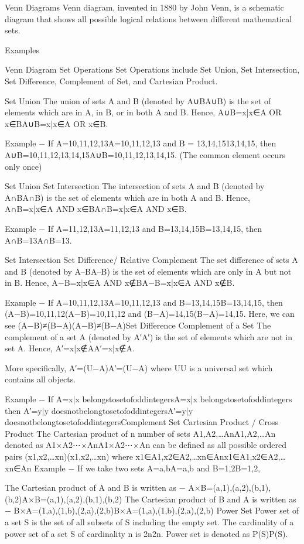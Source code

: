 \documentclass[12pt]{article}
\begin{document}
{Venn Diagrams
Venn diagram, invented in 1880 by John Venn, is a schematic diagram that shows all possible logical relations between different mathematical sets.

Examples

Venn Diagram
Set Operations
Set Operations include Set Union, Set Intersection, Set Difference, Complement of Set, and Cartesian Product.

Set Union
The union of sets A and B (denoted by A∪BA∪B) is the set of elements which are in A, in B, or in both A and B. Hence, A∪B={x|x∈A OR x∈B}A∪B={x|x∈A OR x∈B}.

Example − If A={10,11,12,13}A={10,11,12,13} and B = {13,14,15}{13,14,15}, then A∪B={10,11,12,13,14,15}A∪B={10,11,12,13,14,15}. (The common element occurs only once)

Set Union
Set Intersection
The intersection of sets A and B (denoted by A∩BA∩B) is the set of elements which are in both A and B. Hence, A∩B={x|x∈A AND x∈B}A∩B={x|x∈A AND x∈B}.

Example − If A={11,12,13}A={11,12,13} and B={13,14,15}B={13,14,15}, then A∩B={13}A∩B={13}.

Set Intersection
Set Difference/ Relative Complement
The set difference of sets A and B (denoted by A–BA–B) is the set of elements which are only in A but not in B. Hence, A−B={x|x∈A AND x∉B}A−B={x|x∈A AND x∉B}.

Example − If A={10,11,12,13}A={10,11,12,13} and B={13,14,15}B={13,14,15}, then (A−B)={10,11,12}(A−B)={10,11,12} and (B−A)={14,15}(B−A)={14,15}. Here, we can see (A−B)≠(B−A)(A−B)≠(B−A)Set Difference
Complement of a Set
The complement of a set A (denoted by A′A′) is the set of elements which are not in set A. Hence, A′={x|x∉A}A′={x|x∉A}.

More specifically, A′=(U−A)A′=(U−A) where UU is a universal set which contains all objects.

Example − If A={x|x belongstosetofoddintegers}A={x|x belongstosetofoddintegers} then A′={y|y doesnotbelongtosetofoddintegers}A′={y|y doesnotbelongtosetofoddintegers}Complement Set
Cartesian Product / Cross Product
The Cartesian product of n number of sets A1,A2,…AnA1,A2,…An denoted as A1×A2⋯×AnA1×A2⋯×An can be defined as all possible ordered pairs (x1,x2,…xn)(x1,x2,…xn) where x1∈A1,x2∈A2,…xn∈Anx1∈A1,x2∈A2,…xn∈An
Example − If we take two sets A={a,b}A={a,b} and B={1,2}B={1,2},

The Cartesian product of A and B is written as − A×B={(a,1),(a,2),(b,1),(b,2)}A×B={(a,1),(a,2),(b,1),(b,2)}
The Cartesian product of B and A is written as − B×A={(1,a),(1,b),(2,a),(2,b)}B×A={(1,a),(1,b),(2,a),(2,b)}
Power Set
Power set of a set S is the set of all subsets of S including the empty set. The cardinality of a power set of a set S of cardinality n is 2n2n. Power set is denoted as P(S)P(S).

}
\end{document}
